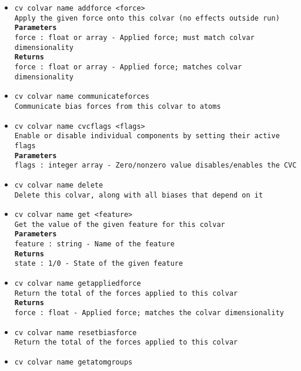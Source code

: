 \begin{itemize}
\item \texttt{cv colvar name addforce <force>}
\\
\texttt{Apply the given force onto this colvar (no effects outside run)}
\\
\texttt{\textbf{Parameters}}
\\
\texttt{force : float or array - Applied force; must match colvar dimensionality}
\\
\texttt{\textbf{Returns}}
\\
\texttt{force : float or array - Applied force; matches colvar dimensionality}
\item \texttt{cv colvar name communicateforces}
\\
\texttt{Communicate bias forces from this colvar to atoms}
\item \texttt{cv colvar name cvcflags <flags>}
\\
\texttt{Enable or disable individual components by setting their active flags}
\\
\texttt{\textbf{Parameters}}
\\
\texttt{flags : integer array - Zero/nonzero value disables/enables the CVC}
\item \texttt{cv colvar name delete}
\\
\texttt{Delete this colvar, along with all biases that depend on it}
\item \texttt{cv colvar name get <feature>}
\\
\texttt{Get the value of the given feature for this colvar}
\\
\texttt{\textbf{Parameters}}
\\
\texttt{feature : string - Name of the feature}
\\
\texttt{\textbf{Returns}}
\\
\texttt{state : 1/0 - State of the given feature}
\item \texttt{cv colvar name getappliedforce}
\\
\texttt{Return the total of the forces applied to this colvar}
\\
\texttt{\textbf{Returns}}
\\
\texttt{force : float - Applied force; matches the colvar dimensionality}
\item \texttt{cv colvar name resetbiasforce}
\\
\texttt{Return the total of the forces applied to this colvar}
\item \texttt{cv colvar name getatomgroups}

\end{itemize}
